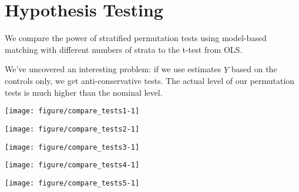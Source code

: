 \documentclass[11pt]{article}\usepackage[]{graphicx}\usepackage[]{color}
\makeatletter
\def\maxwidth{ %
  \ifdim\Gin@nat@width>\linewidth
    \linewidth
  \else
    \Gin@nat@width
  \fi
}
\newenvironment{knitrout}{}{} %
\makeatother
\begin{document}
\section{Hypothesis Testing}
We compare the power of stratified permutation tests using model-based matching with different numbers of strata to the t-test from OLS.

We've uncovered an interesting problem: if we use estimates $\hat{Y}$ based on the controls only, we get anti-conservative tests.  The actual level of our permutation tests is much higher than the nominal level.



\begin{knitrout}
\color{fgcolor}

{\centering \texttt{[image: figure/compare\_tests1-1]} 

}



\end{knitrout}

\begin{knitrout}
\color{fgcolor}

{\centering \texttt{[image: figure/compare\_tests2-1]} 

}



\end{knitrout}

\begin{knitrout}
\color{fgcolor}

{\centering \texttt{[image: figure/compare\_tests3-1]} 

}



\end{knitrout}

\begin{knitrout}
\color{fgcolor}

{\centering \texttt{[image: figure/compare\_tests4-1]} 

}



\end{knitrout}

\begin{knitrout}
\color{fgcolor}

{\centering \texttt{[image: figure/compare\_tests5-1]} 

}



\end{knitrout}
\end{document}

